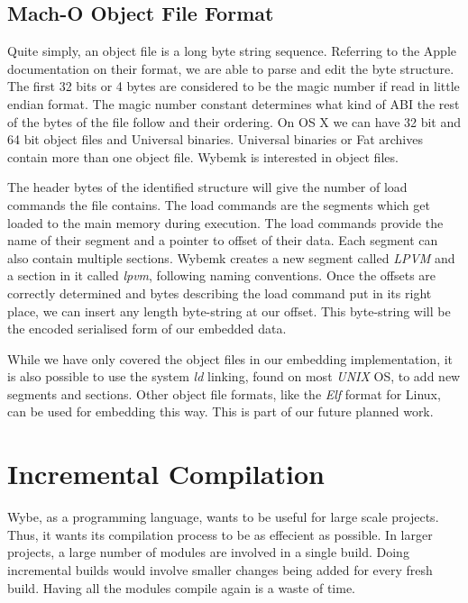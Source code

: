 \subsection{Mach-O Object File Format}

Quite simply, an object file is a long byte string sequence. Referring to the
Apple documentation on their format, we are able to parse and edit the \macho
byte structure. The first 32 bits or 4 bytes are considered to be the magic
number if read in little endian format. The magic number constant determines
what kind of ABI the rest of the bytes of the file follow and their
ordering. On OS X we can have 32 bit and 64 bit \macho object files and
Universal binaries. Universal binaries or Fat archives contain more than one
object file. Wybemk is interested in \macho object files.

The header bytes of the identified structure will give the number of load
commands the file contains. The load commands are the segments which get loaded
to the main memory during execution. The load commands provide the name of
their segment and a pointer to offset of their data. Each segment can also
contain multiple sections. Wybemk creates a new segment called
\textit{\textunderscore \textunderscore LPVM} and a section in it called
\textit{\textunderscore \textunderscore lpvm}, following naming
conventions. Once the offsets are correctly determined and bytes describing the
load command put in its right place, we can insert any length byte-string at
our offset. This byte-string will be the encoded serialised form of our
embedded data.

While we have only covered the \macho object files in our embedding
implementation, it is also possible to use the system \textit{ld} linking,
found on most \textit{UNIX} OS, to add new segments and sections. Other object
file formats, like the \textit{Elf} format for Linux, can be used for embedding
this way. This is part of our future planned work.




\section{Incremental Compilation}

Wybe, as a programming language, wants to be useful for large scale
projects. Thus, it wants its compilation process to be as effecient as
possible. In larger projects, a large number of modules are involved in a
single build. Doing incremental builds would involve smaller changes being
added for every fresh build. Having all the modules compile again is a waste of
time. 

